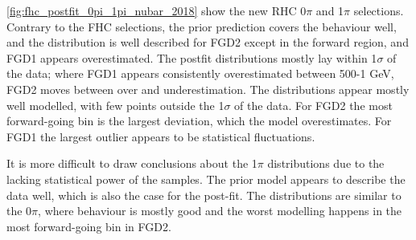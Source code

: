 \autoref{fig:fhc_postfit_0pi_1pi_nubar_2018} show the new RHC 0$\pi$ and 1$\pi$ selections. Contrary to the FHC selections, the prior prediction covers the \pmu behaviour well, and the \cosmu distribution is well described for FGD2 except in the forward region, and FGD1 appears overestimated. The postfit distributions mostly lay within 1$\sigma$ of the data; where FGD1 appears consistently overestimated between 500-1 GeV, FGD2 moves between over and underestimation. The \cosmu distributions appear mostly well modelled, with few points outside the 1$\sigma$ of the data. For FGD2 the most forward-going bin is the largest deviation, which the model overestimates. For FGD1 the largest outlier appears to be statistical fluctuations.

It is more difficult to draw conclusions about the 1$\pi$ distributions due to the lacking statistical power of the samples. The prior model appears to describe the data well, which is also the case for the post-fit. The \cosmu distributions are similar to the 0$\pi$, where behaviour is mostly good and the worst modelling happens in the most forward-going bin in FGD2.
